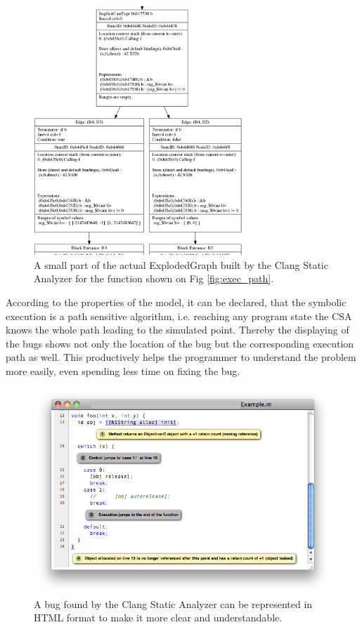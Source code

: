 \documentclass[oneside, a4paper, 12pt]{article}
\theoremstyle{definition}
\begin{document}
\begin{figure}[h]
	\centering
	\includegraphics[width=0.7\textwidth]{img/eg}
	\caption{A small part of the actual ExplodedGraph built by the Clang 
	Static Analyzer for the function shown on Fig \ref{fig:exec_path}.}
	\label{fig:exploded_graph2}
\end{figure}

According to the properties of the model, it can be declared, that the symbolic 
execution is a path sensitive algorithm, i.e. reaching any program state the 
CSA knows the whole path leading to the simulated point. Thereby the displaying 
of the bugs shows not only the location of the bug but the corresponding 
execution path as well. This productively helps the programmer to understand 
the problem more easily, even spending less time on fixing the bug.

\begin{figure}[h]
	\centering
	\includegraphics[width=1\textwidth]{img/view}
	\caption{A bug found by the Clang Static Analyzer can be represented in HTML format to make it more clear and understandable.}
	\label{fig:hibak_megjelenitese}
\end{figure}
\end{document}
